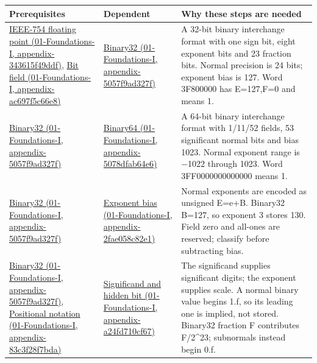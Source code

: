 {\def\LTcaptype{none} %
\begin{longtable}[]{@{}
  >{\raggedright\arraybackslash}p{}
  >{\raggedright\arraybackslash}p{}
  >{\raggedright\arraybackslash}p{}@{}}
\toprule\noalign{}
\begin{minipage}[b]{\linewidth}\raggedright
Prerequisites
\end{minipage} & \begin{minipage}[b]{\linewidth}\raggedright
Dependent
\end{minipage} & \begin{minipage}[b]{\linewidth}\raggedright
Why these steps are needed
\end{minipage} \\
\midrule\noalign{}
\endhead
\bottomrule\noalign{}
\endlastfoot
\href{../01-Foundations-I/main.pdf\#nameddest=appendix-343615f49ddf}{IEEE-754 floating point (01-Foundations-I, appendix-343615f49ddf)}, \href{../01-Foundations-I/main.pdf\#nameddest=appendix-ac697f5c66e8}{Bit field (01-Foundations-I, appendix-ac697f5c66e8)} & \href{../01-Foundations-I/main.pdf\#nameddest=appendix-5057f9ad327f}{Binary32 (01-Foundations-I, appendix-5057f9ad327f)} & A 32-bit binary interchange format with one sign bit, eight exponent bits and 23 fraction bits. Normal precision is 24 bits; exponent bias is 127. Word 3F800000 has E=127,F=0 and means 1. \\
\href{../01-Foundations-I/main.pdf\#nameddest=appendix-5057f9ad327f}{Binary32 (01-Foundations-I, appendix-5057f9ad327f)} & \href{../01-Foundations-I/main.pdf\#nameddest=appendix-5078dfab64e6}{Binary64 (01-Foundations-I, appendix-5078dfab64e6)} & A 64-bit binary interchange format with 1/11/52 fields, 53 significant normal bits and bias 1023. Normal exponent range is −1022 through 1023. Word 3FF0000000000000 means 1. \\
\href{../01-Foundations-I/main.pdf\#nameddest=appendix-5057f9ad327f}{Binary32 (01-Foundations-I, appendix-5057f9ad327f)} & \href{../01-Foundations-I/main.pdf\#nameddest=appendix-2fae058c82e1}{Exponent bias (01-Foundations-I, appendix-2fae058c82e1)} & Normal exponents are encoded as unsigned E=e+B. Binary32 B=127, so exponent 3 stores 130. Field zero and all-ones are reserved; classify before subtracting bias. \\
\href{../01-Foundations-I/main.pdf\#nameddest=appendix-5057f9ad327f}{Binary32 (01-Foundations-I, appendix-5057f9ad327f)}, \href{../01-Foundations-I/main.pdf\#nameddest=appendix-83c3f28f7bda}{Positional notation (01-Foundations-I, appendix-83c3f28f7bda)} & \href{../01-Foundations-I/main.pdf\#nameddest=appendix-a24fd710cf67}{Significand and hidden bit (01-Foundations-I, appendix-a24fd710cf67)} & The significand supplies significant digits; the exponent supplies scale. A normal binary value begins 1.f, so its leading one is implied, not stored. Binary32 fraction F contributes F/2\^{}23; subnormals instead begin 0.f. \\

\end{longtable}}

